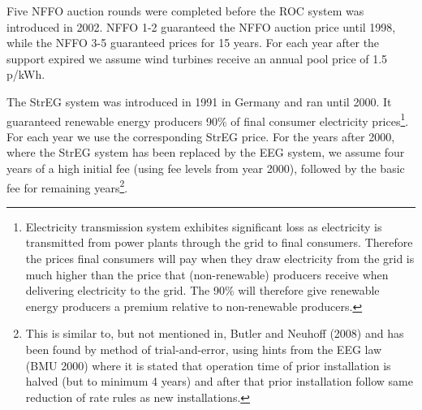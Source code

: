 \documentclass[a4paper, 12pt]{article}
\begin{document}
Five NFFO auction rounds were completed before the ROC system was introduced in 2002. NFFO 1-2 guaranteed the NFFO auction price until 1998, while the NFFO 3-5 guaranteed prices for 15 years. For each year after the support expired we assume wind turbines receive an annual pool price of 1.5 p/kWh. 

The StrEG system was introduced in 1991 in Germany and ran until 2000. It guaranteed renewable energy producers 90\% of final consumer electricity prices\footnote{Electricity transmission system exhibites significant loss as electricity is transmitted from power plants through the grid to final consumers. Therefore the prices final consumers will pay when they draw electricity from the grid is much higher than the price that (non-renewable) producers receive when delivering electricity to the grid. The 90\% will therefore give renewable energy producers a premium relative to non-renewable producers.}. For each year we use the corresponding StrEG price. For the years after 2000, where the StrEG system has been replaced by the EEG system, we assume four years of a high initial fee (using fee levels from year 2000), followed by the basic fee for remaining years\footnote{This is similar to, but not mentioned in, Butler and Neuhoff (2008) and has been found by method of trial-and-error, using hints from the EEG law (BMU 2000) where it is stated that operation time of prior installation is halved (but to minimum 4 years) and after that prior installation follow same reduction of rate rules as new installations.}.
\end{document}
